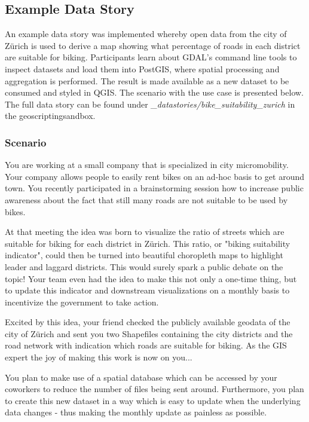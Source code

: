 \documentclass[11pt, a4paper, oneside, parskip=full-]{scrartcl}
\begin{document}
\subsection{Example Data Story}
An example data story was implemented whereby open data from the city of Zürich
is used to derive a map showing what percentage of roads in each district are
suitable for biking. Participants learn about GDAL's command line tools to
inspect datasets and load them into PostGIS\cite{postgis}, where spatial
processing and aggregation is performed. The result is made available as a new
dataset to be consumed and styled in QGIS\cite{qgis}. The scenario with the use
case is presented below. The full data story can be found under
\emph{\_datastories/bike\_suitability\_zurich} in the geoscriptingsandbox.

\subsubsection*{Scenario}

You are working at a small company that is specialized in city micromobility.
Your company allows people to easily rent bikes on an ad-hoc basis to get around
town. You recently participated in a brainstorming session how to increase
public awareness about the fact that still many roads are not suitable to be
used by bikes.

At that meeting the idea was born to visualize the ratio of streets which are
suitable for biking for each district in Zürich. This ratio, or "biking
suitability indicator", could then be turned into beautiful choropleth maps to
highlight leader and laggard districts. This would surely spark a public debate
on the topic! Your team even had the idea to make this not only a one-time
thing, but to update this indicator and downstream visualizations on a monthly
basis to incentivize the government to take action.

Excited by this idea, your friend checked the publicly available geodata of the
city of Zürich and sent you two Shapefiles containing the city districts and the
road network with indication which roads are suitable for biking. As the GIS
expert the joy of making this work is now on you...

You plan to make use of a spatial database which can be accessed by your
coworkers to reduce the number of files being sent around. Furthermore, you plan
to create this new dataset in a way which is easy to update when the underlying
data changes - thus making the monthly update as painless as possible.
\end{document}
